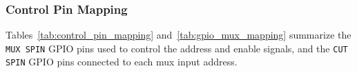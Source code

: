 \FloatBarrier
\newpage
\subsubsection{Control Pin Mapping}\label{control-pin-mapping}

Tables~\ref{tab:control_pin_mapping} and~\ref{tab:gpio_mux_mapping}
summarize the \texttt{MUX SPIN} GPIO pins used to control the address and
enable signals, and the \texttt{CUT SPIN} GPIO pins connected to each mux
input address.

\begingroup
\small
\setlength{\tabcolsep}{4pt}
\renewcommand{\arraystretch}{1.3}
\setlength{\abovecaptionskip}{5pt}
\setlength{\belowcaptionskip}{5pt}

\begin{center}
\label{tab:control_pin_mapping}
\end{center}


